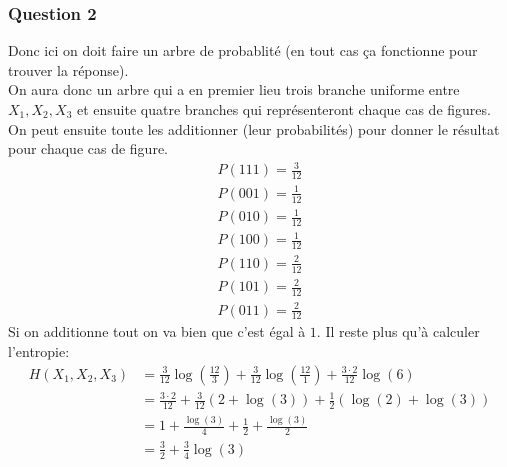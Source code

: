 \subsubsection{Question 2}
Donc ici on doit faire un arbre de probablité (en tout cas ça fonctionne pour trouver la réponse).\\
On aura donc un arbre qui a en premier lieu trois branche uniforme entre $X_1, X_2, X_3$ et ensuite quatre branches qui représenteront chaque cas de figures. On peut ensuite toute les additionner (leur probabilités) pour donner le résultat pour chaque cas de figure.
\begin{align*} 
    P\left(111\right) = \frac{3}{12}\\
    P\left(001\right) = \frac{1}{12}\\
    P\left(010\right) = \frac{1}{12}\\
    P\left(100\right) =  \frac{1}{12}\\
    P\left(110\right) = \frac{2}{12}\\
    P\left(101\right) = \frac{2}{12}\\
    P\left(011\right) = \frac{2}{12}
\end{align*}
Si on additionne tout on va bien que c'est égal à $1$. Il reste plus qu'à calculer l'entropie:
\begin{align*} 
    H\left(X_1, X_2, X_3 \right) &= \frac{3}{12} \log \left(\frac{12}{3}\right) + \frac{3}{12}\log\left(\frac{12}{1}\right) + \frac{3 \cdot  2}{12} \log\left(6\right)\\
    &= \frac{3\cdot 2}{12} + \frac{3}{12}\left(2 + \log\left(3\right)\right) + \frac{1}{2}\left(\log\left(2\right) + \log\left(3\right)\right)\\
    &= 1 + \frac{\log\left(3\right)}{4} + \frac{1}{2} + \frac{\log\left(3\right)}{2}\\
    &= \frac{3}{2} + \frac{3}{4} \log\left(3\right)
\end{align*}

